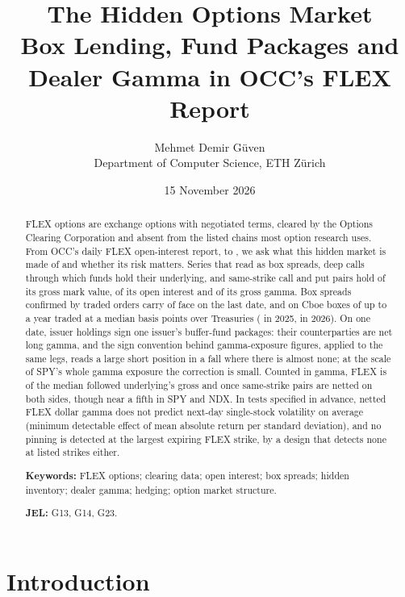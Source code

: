 \documentclass[11pt]{article}
\title{\textbf{The Hidden Options Market}\\[0.4em]
\large Box Lending, Fund Packages and Dealer Gamma in OCC's FLEX Report}
\author{Mehmet Demir G\"uven\\[0.2em]
\small Department of Computer Science, ETH Z\"urich}
\date{15 November 2026}
\begin{document}
\maketitle

\begin{abstract}
\noindent
FLEX options are exchange options with negotiated terms, cleared by the Options Clearing
Corporation and absent from the listed chains most option research uses. From OCC's daily
FLEX open-interest report, \PanelStart{} to \PanelEnd{}, we ask what this hidden market is
made of and whether its risk matters. Series that read as box spreads, deep calls through
which funds hold their underlying, and same-strike call and put pairs hold
\AnatFinancingValueShare{} of its gross mark value, \AnatNonOptionOIShare{} of its open
interest and \AnatNonOptionGamma{} of its gross gamma. Box spreads confirmed by traded
orders carry \BoxRTradedFace{} of face on the last date, and on Cboe boxes of up to a
year traded at a median \BoxRSpreadMedian{} basis points over Treasuries
(\BoxRYearTwentyTwentyFive{} in 2025, \BoxRYearTwentyTwentySix{} in 2026). On one date,
issuer holdings sign one issuer's buffer-fund packages: their counterparties are net long
gamma, and the sign convention behind gamma-exposure figures, applied to the same legs,
reads a large short position in a fall where there is almost none; at the scale of SPY's
whole gamma exposure the correction is small. Counted in gamma,
FLEX is \GammaMedianGross{} of the median followed underlying's gross and
\GammaMedianBoth{} once same-strike pairs are netted on both sides, though near a fifth
in SPY and NDX. In tests specified in advance, netted FLEX dollar gamma does not predict
next-day single-stock volatility on average (minimum detectable effect \GPredMDEShare{}
of mean absolute return per standard deviation), and no pinning is detected at the
largest expiring FLEX strike, by a design that detects none at listed strikes either.
\par\vspace{0.8em}
\noindent\textbf{Keywords:} FLEX options; clearing data; open interest; box spreads;
hidden inventory; dealer gamma; hedging; option market structure.

\noindent\textbf{JEL:} G13, G14, G23.
\end{abstract}

\section{Introduction}
\end{document}
